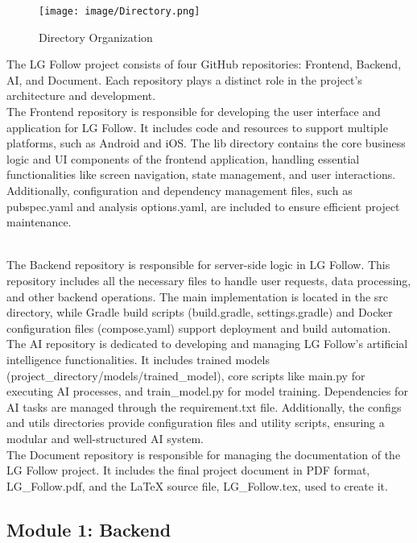 \documentclass[conference]{IEEEtran}
\begin{document}
\begin{figure}[h!]
    \centering
    \texttt{[image: image/Directory.png]}
    \caption{Directory Organization}
    \label{fig:enter-label}
\end{figure}

The LG Follow project consists of four GitHub repositories: Frontend, Backend, AI, and Document. Each repository plays a distinct role in the project’s architecture and development.\\

The Frontend repository is responsible for developing the user interface and application for LG Follow. It includes code and resources to support multiple platforms, such as Android and iOS. The lib directory contains the core business logic and UI components of the frontend application, handling essential functionalities like screen navigation, state management, and user interactions. Additionally, configuration and dependency management files, such as pubspec.yaml and analysis options.yaml, are included to ensure efficient project maintenance.\\
\

The Backend repository is responsible for server-side logic in LG Follow. This repository includes all the necessary files to handle user requests, data processing, and other backend operations. The main implementation is located in the src directory, while Gradle build scripts (build.gradle, settings.gradle) and Docker configuration files (compose.yaml) support deployment and build automation.\\

The AI repository is dedicated to developing and managing LG Follow’s artificial intelligence functionalities. It includes trained models (project\_directory/models/trained\_model), core scripts like main.py for executing AI processes, and train\_model.py for model training. Dependencies for AI tasks are managed through the requirement.txt file. Additionally, the configs and utils directories provide configuration files and utility scripts, ensuring a modular and well-structured AI system.\\

The Document repository is responsible for managing the documentation of the LG Follow project. It includes the final project document in PDF format, LG\_Follow.pdf, and the LaTeX source file, LG\_Follow.tex, used to create it.\\

\subsection{Module 1: Backend}
\end{document}
